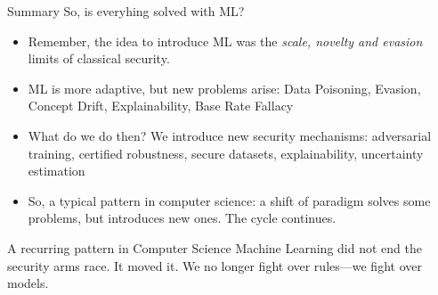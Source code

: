 \documentclass[aspectratio=169,10pt]{beamer}
\newcommand{\term}[1]{{\color{mlink}\textbf{#1}}}         %
\begin{document}
\begin{frame}{Summary}
  So, is everyhing solved with ML?
  \begin{itemize}
    \item Remember, the idea to introduce ML was the \emph{scale, novelty and evasion} limits of classical security.
    \item ML is more adaptive, but new problems arise: Data Poisoning, Evasion, Concept Drift, Explainability, Base Rate Fallacy
    \item What do we do then? We introduce new security mechanisms: adversarial training, certified robustness, secure datasets, explainability, uncertainty estimation
    \item So, a typical pattern in computer science: a shift of paradigm solves some problems, but introduces new ones. The cycle continues.
  \end{itemize}
  \begin{block}{A recurring pattern in Computer Science}
  Machine Learning did not end the security arms race. It moved it. We no longer fight over rules—we fight over models.
  \end{block}

\end{frame}

\end{document}
